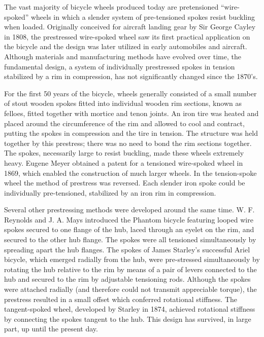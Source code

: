 \documentclass[../thesis.tex]{subfiles}
\begin{document}
The vast majority of bicycle wheels produced today are pretensioned ``wire-spoked'' wheels in which a slender system of pre-tensioned spokes resist buckling when loaded. Originally conceived for aircraft landing gear by Sir George Cayley in 1808, the prestressed wire-spoked wheel saw its first practical application on the bicycle and the design was later utilized in early automobiles and aircraft\cite{}. Although materials and manufacturing methods have evolved over time, the fundamental design, a system of individually prestressed spokes in tension stabilized by a rim in compression, has not significantly changed since the 1870's.

For the first 50 years of the bicycle, wheels generally consisted of a small number of stout wooden spokes fitted into individual wooden rim sections, known as felloes, fitted together with mortice and tenon joints. An iron tire was heated and placed around the circumference of the rim and allowed to cool and contract, putting the spokes in compression and the tire in tension\cite{Sharp}. The structure was held together by this prestress; there was no need to bond the rim sections together. The spokes, necessarily large to resist buckling, made these wheels extremely heavy. Eugene Meyer obtained a patent for a tensioned wire-spoked wheel in 1869, which enabled the construction of much larger wheels\cite{Clayton}. In the tension-spoke wheel the method of prestress was reversed. Each slender iron spoke could be individually pre-tensioned, stabilized by an iron rim in compression.

Several other prestressing methods were developed around the same time. W. F. Reynolds and J. A. Mays introduced the Phantom bicycle featuring looped wire spokes secured to one flange of the hub, laced through an eyelet on the rim, and secured to the other hub flange\cite{Herlihy}. The spokes were all tensioned simultaneously by spreading apart the hub flanges. The spokes of James Starley's successful Ariel bicycle, which emerged radially from the hub, were pre-stressed simultaneously by rotating the hub relative to the rim by means of a pair of levers connected to the hub and secured to the rim by adjustable tensioning rods\cite{}. Although the spokes were attached radially (and therefore could not transmit appreciable torque), the prestress resulted in a small offset which conferred rotational stiffness. The tangent-spoked wheel, developed by Starley in 1874, achieved rotational stiffness by connecting the spokes tangent to the hub. This design has survived, in large part, up until the present day.
\end{document}
